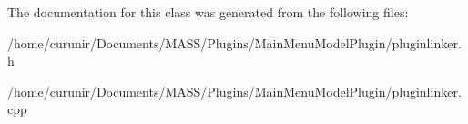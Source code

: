 The documentation for this class was generated from the following files\+:\begin{DoxyCompactItemize}
\item 
/home/curunir/\+Documents/\+M\+A\+S\+S/\+Plugins/\+Main\+Menu\+Model\+Plugin/pluginlinker.\+h\item 
/home/curunir/\+Documents/\+M\+A\+S\+S/\+Plugins/\+Main\+Menu\+Model\+Plugin/pluginlinker.\+cpp\end{DoxyCompactItemize}
